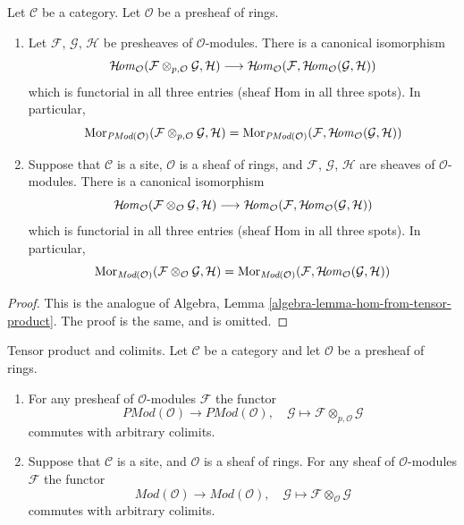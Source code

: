 \begin{lemma}
\label{lemma-internal-hom-adjoint-tensor}
Let $\mathcal{C}$ be a category. Let $\mathcal{O}$ be a presheaf of
rings.
\begin{enumerate}
\item Let $\mathcal{F}$, $\mathcal{G}$, $\mathcal{H}$ be
presheaves of $\mathcal{O}$-modules. There is a canonical isomorphism
$$
\mathop{\mathcal{H}\!\mathit{om}}\nolimits_\mathcal{O}
(\mathcal{F} \otimes_{p, \mathcal{O}} \mathcal{G}, \mathcal{H})
\longrightarrow
\mathop{\mathcal{H}\!\mathit{om}}\nolimits_\mathcal{O}
(\mathcal{F}, \mathop{\mathcal{H}\!\mathit{om}}\nolimits_\mathcal{O}(\mathcal{G}, \mathcal{H}))
$$
which is functorial in all three entries (sheaf Hom in
all three spots). In particular,
$$
\mathop{\mathrm{Mor}}\nolimits_{\textit{PMod}(\mathcal{O})}(
\mathcal{F} \otimes_{p, \mathcal{O}} \mathcal{G}, \mathcal{H})
=
\mathop{\mathrm{Mor}}\nolimits_{\textit{PMod}(\mathcal{O})}(
\mathcal{F}, \mathop{\mathcal{H}\!\mathit{om}}\nolimits_\mathcal{O}(\mathcal{G}, \mathcal{H}))
$$
\item
Suppose that $\mathcal{C}$ is a site, $\mathcal{O}$ is a sheaf of rings,
and $\mathcal{F}$, $\mathcal{G}$, $\mathcal{H}$ are sheaves of
$\mathcal{O}$-modules. There is a canonical isomorphism
$$
\mathop{\mathcal{H}\!\mathit{om}}\nolimits_\mathcal{O}
(\mathcal{F} \otimes_\mathcal{O} \mathcal{G}, \mathcal{H})
\longrightarrow
\mathop{\mathcal{H}\!\mathit{om}}\nolimits_\mathcal{O}
(\mathcal{F}, \mathop{\mathcal{H}\!\mathit{om}}\nolimits_\mathcal{O}(\mathcal{G}, \mathcal{H}))
$$
which is functorial in all three entries (sheaf Hom in
all three spots). In particular,
$$
\mathop{\mathrm{Mor}}\nolimits_{\textit{Mod}(\mathcal{O})}(
\mathcal{F} \otimes_\mathcal{O} \mathcal{G}, \mathcal{H})
=
\mathop{\mathrm{Mor}}\nolimits_{\textit{Mod}(\mathcal{O})}(
\mathcal{F}, \mathop{\mathcal{H}\!\mathit{om}}\nolimits_\mathcal{O}(\mathcal{G}, \mathcal{H}))
$$
\end{enumerate}
\end{lemma}

\begin{proof}
This is the analogue of
Algebra, Lemma \ref{algebra-lemma-hom-from-tensor-product}.
The proof is the same, and is omitted.
\end{proof}

\begin{lemma}
\label{lemma-tensor-commute-colimits}
Tensor product and colimits.
Let $\mathcal{C}$ be a category and let $\mathcal{O}$ be a presheaf of rings.
\begin{enumerate}
\item For any presheaf of $\mathcal{O}$-modules $\mathcal{F}$ the functor
$$
\textit{PMod}(\mathcal{O}) \longrightarrow \textit{PMod}(\mathcal{O})
, \quad
\mathcal{G} \longmapsto \mathcal{F} \otimes_{p, \mathcal{O}} \mathcal{G}
$$
commutes with arbitrary colimits.
\item
Suppose that $\mathcal{C}$ is a site, and $\mathcal{O}$ is a sheaf of rings.
For any sheaf of $\mathcal{O}$-modules $\mathcal{F}$ the functor
$$
\textit{Mod}(\mathcal{O}) \longrightarrow \textit{Mod}(\mathcal{O})
, \quad
\mathcal{G} \longmapsto \mathcal{F} \otimes_\mathcal{O} \mathcal{G}
$$
commutes with arbitrary colimits.
\end{enumerate}
\end{lemma}

